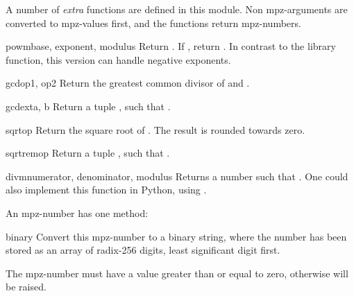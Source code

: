 A number of \emph{extra} functions are defined in this module. Non
mpz-arguments are converted to mpz-values first, and the functions
return mpz-numbers.

\begin{funcdesc}{powm}{base, exponent, modulus}
  Return . If
  , return . In contrast to the
  \C{} library function, this version can handle negative exponents.
\end{funcdesc}

\begin{funcdesc}{gcd}{op1, op2}
  Return the greatest common divisor of  and .
\end{funcdesc}

\begin{funcdesc}{gcdext}{a, b}
  Return a tuple , such that
  .
\end{funcdesc}

\begin{funcdesc}{sqrt}{op}
  Return the square root of . The result is rounded towards zero.
\end{funcdesc}

\begin{funcdesc}{sqrtrem}{op}
  Return a tuple , such that
  .
\end{funcdesc}

\begin{funcdesc}{divm}{numerator, denominator, modulus}
  Returns a number  such that
  .  One could also implement this function in Python,
  using .
\end{funcdesc}

An mpz-number has one method:

\begin{methoddesc}[mpz]{binary}{}
  Convert this mpz-number to a binary string, where the number has been
  stored as an array of radix-256 digits, least significant digit first.

  The mpz-number must have a value greater than or equal to zero,
  otherwise  will be raised.
\end{methoddesc}


\begin{seealso}

\end{seealso}
